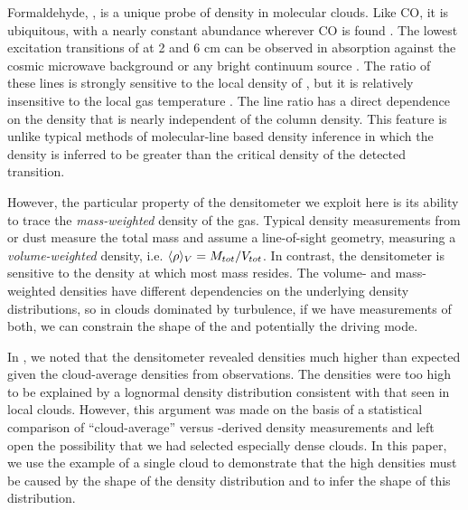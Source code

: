 Formaldehyde, \formaldehyde, is a unique probe of density in molecular clouds.
Like CO, it is ubiquitous, with a nearly constant abundance wherever CO is
found \citep{Mangum1993a,Tang2013a}.  The lowest excitation transitions of
\ortho at 2 and 6 cm can be observed in absorption against the cosmic microwave
background or any bright continuum source \citep{Ginsburg2011a,Darling2012b}.
The ratio of these lines is strongly sensitive to the local density of \hh, but
it is relatively insensitive to the local gas temperature
\citep{Troscompt2009a,Wiesenfeld2013a}.  The \formaldehyde line ratio has a
direct dependence on the density that is nearly independent of the column
density.  This feature is unlike typical methods of molecular-line based density
inference in which the density is inferred to be greater than the critical density
of the detected transition.

However, the particular property of the \formaldehyde densitometer we exploit
here is its ability to trace the \emph{mass-weighted} density of the gas.
Typical density measurements from \thirteenco or dust measure the total mass
and assume a line-of-sight geometry, measuring a \emph{volume-weighted}
density, i.e. $\langle\rho\rangle_V = M_{tot}/V_{tot}$.  In contrast, the \formaldehyde
densitometer is sensitive to the density at which most mass resides.
The volume- and mass- weighted densities have different dependencies on the
underlying density distributions, so in clouds dominated by turbulence, if we
have measurements of both, we can constrain the shape of the \rhoPDF and
potentially the driving mode.

In \citet{Ginsburg2011a}, we noted that the \formaldehyde densitometer revealed
\hh densities much higher than expected given the cloud-average densities from
\thirteenco observations.  The densities were too high to be explained by a
lognormal density distribution consistent with that seen in local clouds.
However, this argument was made on the basis of a statistical comparison of
``cloud-average'' versus \formaldehyde-derived density measurements and left open
the possibility that we had selected especially dense clouds.  In this paper,
we use the example of a single cloud to demonstrate that the high \formaldehyde
densities must be caused by the shape of the density distribution and to infer the
shape of this distribution.

